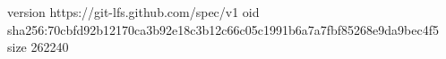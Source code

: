 version https://git-lfs.github.com/spec/v1
oid sha256:70cbfd92b12170ca3b92e18c3b12c66c05c1991b6a7a7fbf85268e9da9bec4f5
size 262240
